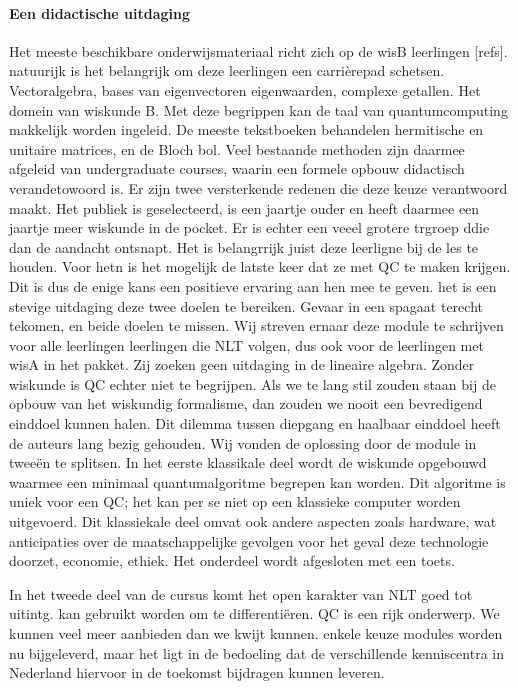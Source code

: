 \documentclass[../../main.tex]{subfiles}
\begin{document}
\paragraph{Een didactische uitdaging} Het meeste beschikbare onderwijsmateriaal richt zich op de wisB leerlingen [refs]. natuurijk is het belangrijk om deze leerlingen  een carri\`erepad schetsen. Vectoralgebra, bases van eigenvectoren eigenwaarden, complexe getallen. Het domein van wiskunde B. Met deze begrippen kan de taal van quantumcomputing makkelijk worden ingeleid. De meeste tekstboeken behandelen hermitische en unitaire matrices, en de Bloch bol. Veel bestaande methoden zijn daarmee afgeleid van undergraduate courses, waarin een formele opbouw didactisch verandetowoord is. Er zijn twee versterkende redenen die deze keuze verantwoord maakt. Het publiek is geselecteerd, is een jaartje ouder en heeft daarmee een jaartje meer wiskunde in de pocket. Er is echter een veeel grotere trgroep ddie dan de aandacht ontsnapt. Het is belangrrijk juist deze leerligne bij de les te houden. Voor hetn is het mogelijk de latste keer dat ze met QC te maken krijgen. Dit is dus de enige kans een positieve ervaring aan hen mee te geven.
het is een stevige uitdaging deze twee doelen te bereiken. Gevaar in een spagaat terecht tekomen, en beide doelen te missen.
Wij streven ernaar deze module te schrijven voor alle leerlingen leerlingen die NLT volgen, dus ook voor de leerlingen met wisA in het pakket. Zij zoeken geen uitdaging in de lineaire algebra. Zonder wiskunde is QC echter niet te begrijpen. Als we te lang stil zouden staan bij de opbouw van het wiskundig formalisme, dan zouden we nooit een bevredigend einddoel kunnen halen. Dit dilemma tussen diepgang en haalbaar einddoel heeft de auteurs lang bezig gehouden. Wij vonden de oplossing door de module in twee\"en te splitsen. In het eerste klassikale deel wordt de wiskunde opgebouwd waarmee een minimaal quantumalgoritme begrepen kan worden. Dit algoritme is uniek voor een QC; het kan per se niet op een klassieke computer worden uitgevoerd. Dit klassiekale deel omvat ook andere aspecten zoals hardware, wat anticipaties over de maatschappelijke gevolgen voor het geval deze technologie doorzet, economie, ethiek. Het onderdeel wordt afgesloten met een toets. 
 


In het tweede deel van de cursus komt het open karakter van NLT goed tot uitintg.  kan gebruikt worden om te differenti\"eren. QC is een rijk onderwerp. We kunnen veel meer aanbieden dan we kwijt kunnen. enkele keuze modules worden nu bijgeleverd, maar het ligt in de bedoeling dat de verschillende kenniscentra in Nederland hiervoor in de toekomst bijdragen kunnen leveren.
\end{document}
